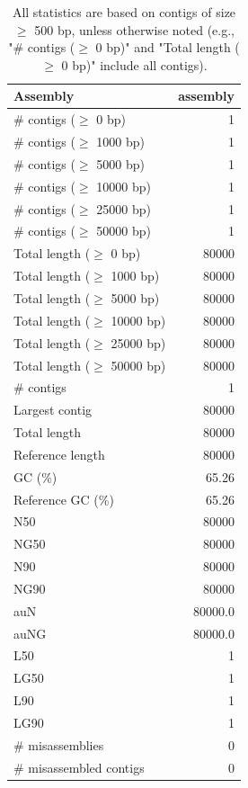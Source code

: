 \documentclass[12pt,a4paper]{article}
\begin{document}
\begin{table}[ht]
\begin{center}
\caption{All statistics are based on contigs of size $\geq$ 500 bp, unless otherwise noted (e.g., "\# contigs ($\geq$ 0 bp)" and "Total length ($\geq$ 0 bp)" include all contigs).}
\begin{tabular}{|l*{1}{|r}|}
\hline
Assembly & assembly \\ \hline
\# contigs ($\geq$ 0 bp) & 1 \\ \hline
\# contigs ($\geq$ 1000 bp) & 1 \\ \hline
\# contigs ($\geq$ 5000 bp) & 1 \\ \hline
\# contigs ($\geq$ 10000 bp) & 1 \\ \hline
\# contigs ($\geq$ 25000 bp) & 1 \\ \hline
\# contigs ($\geq$ 50000 bp) & 1 \\ \hline
Total length ($\geq$ 0 bp) & 80000 \\ \hline
Total length ($\geq$ 1000 bp) & 80000 \\ \hline
Total length ($\geq$ 5000 bp) & 80000 \\ \hline
Total length ($\geq$ 10000 bp) & 80000 \\ \hline
Total length ($\geq$ 25000 bp) & 80000 \\ \hline
Total length ($\geq$ 50000 bp) & 80000 \\ \hline
\# contigs & 1 \\ \hline
Largest contig & 80000 \\ \hline
Total length & 80000 \\ \hline
Reference length & 80000 \\ \hline
GC (\%) & 65.26 \\ \hline
Reference GC (\%) & 65.26 \\ \hline
N50 & 80000 \\ \hline
NG50 & 80000 \\ \hline
N90 & 80000 \\ \hline
NG90 & 80000 \\ \hline
auN & 80000.0 \\ \hline
auNG & 80000.0 \\ \hline
L50 & 1 \\ \hline
LG50 & 1 \\ \hline
L90 & 1 \\ \hline
LG90 & 1 \\ \hline
\# misassemblies & 0 \\ \hline
\# misassembled contigs & 0 \\ \hline

\end{tabular}
\end{center}
\end{table}
\end{document}
